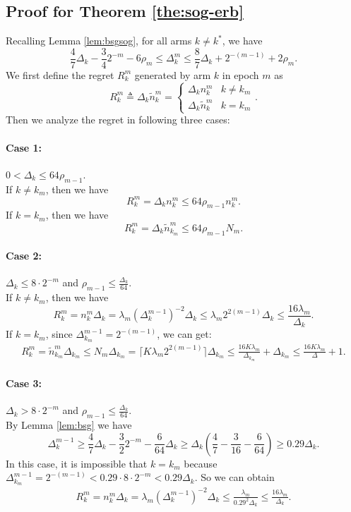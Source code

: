 \subsection{Proof for Theorem \ref{the:sog-erb}}

Recalling Lemma \ref{lem:bsgsog}, for all arms $k \neq k^*$, we have
\[\frac{4}{7}\Delta_k - \frac{3}{4}2^{-m} - 6\rho_m \leq \Delta_k^m \leq \frac{8}{7}\Delta_k + 2^{-(m-1)} + 2\rho_m.\]
We first define the regret $R_k^m$ generated by arm $k$ in epoch $m$ as 
\[R_k^m\triangleq\Delta_k\widetilde{n}_{k}^m=\begin{cases}
    \Delta_kn_{k}^m & k\neq k_m\\
    \Delta_k\widetilde{n}_{k}^m & k=k_m
\end{cases}.\]
Then we analyze the regret in following three cases:

\paragraph{Case 1:} $0<\Delta_k\le 64\rho_{m-1}$.\\ %
If $k \neq k_m$, then we have \[R_k^m=\Delta_k n_{k}^m\le 64\rho_{m-1}n_k^m .\] 
If $k=k_m$, then we have \[R_k^m=\Delta_k\widetilde{n}_{k_m}^m\le 64\rho_{m-1}N_m.\]

\paragraph{Case 2:} $\Delta_k \leq 8 \cdot 2^{-m}$ and $\rho_{m-1} \leq \frac{\Delta_k}{64}$.\\
If $k \neq k_m$, then we have \[R_k^m=n_{k}^m\Delta_k =\lambda_m(\Delta_k^{m-1})^{-2} \Delta_k \leq \lambda_m 2^{2(m-1)} \Delta_k  \leq \frac{16 \lambda_m}{\Delta_k}.\] 
If $k=k_m$, since $\Delta_{k_m}^{m-1} = 2^{-(m-1)}$, we can get:
\begin{align*}
    R_k^m=\widetilde{n}_{k_m}^m \Delta_{k_m} \leq 
    N_m\Delta_{k_m} = \lceil K\lambda_m2^{2(m-1)} \rceil \Delta_{k_m} \leq \frac{16K\lambda_m}{\Delta_{k_m}} +\Delta_{k_m} \leq \frac{16K\lambda_m}{\Delta} + 1.
\end{align*}

\paragraph{Case 3:} $\Delta_k > 8 \cdot 2^{-m}$ and $\rho_{m-1} \leq \frac{\Delta_k}{64}$.\\
By Lemma \ref{lem:bsg} we have
\[\Delta_k^{m-1} \geq \frac{4}{7}\Delta_k - \frac{3}{2}2^{-m} - \frac{6}{64}\Delta_k \geq \Delta_k\left(\frac{4}{7} - \frac{3}{16} - \frac{6}{64}\right) \geq 0.29 \Delta_k.\]
In this case, it is impossible that $k=k_m$ because $\Delta_{k_m}^{m-1} = 2^{-(m-1)}<0.29\cdot 8\cdot 2^{-m}<0.29\Delta_k$.
So we can obtain
\begin{align*}
   R_k^m= n_k^m \Delta_k = \lambda_m(\Delta_k^{m-1})^{-2} \Delta_k
    \leq \frac{\lambda_m}{0.29^2 \Delta_k} 
    \leq \frac{16\lambda_m}{\Delta_k}.
\end{align*}

